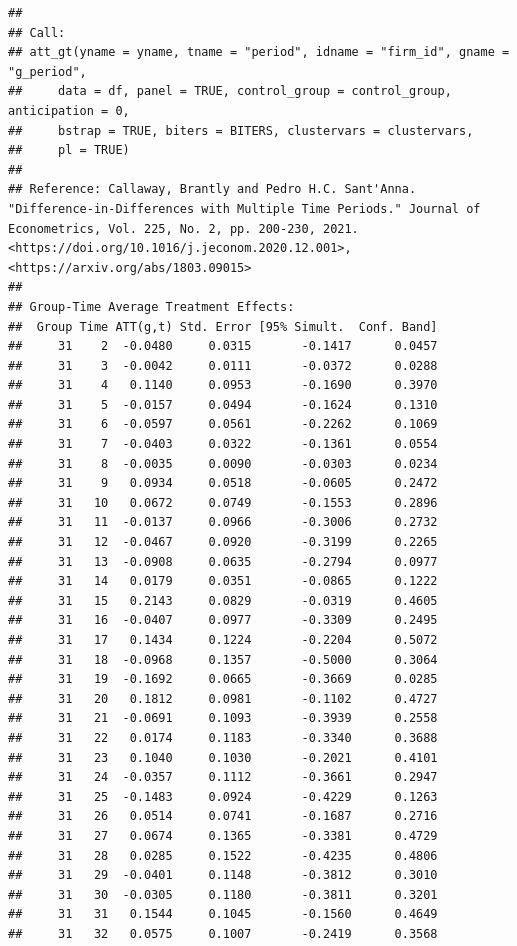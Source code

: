 \documentclass[
]{article}
\begin{document}
\begin{verbatim}
## 
## Call:
## att_gt(yname = yname, tname = "period", idname = "firm_id", gname = "g_period", 
##     data = df, panel = TRUE, control_group = control_group, anticipation = 0, 
##     bstrap = TRUE, biters = BITERS, clustervars = clustervars, 
##     pl = TRUE)
## 
## Reference: Callaway, Brantly and Pedro H.C. Sant'Anna.  "Difference-in-Differences with Multiple Time Periods." Journal of Econometrics, Vol. 225, No. 2, pp. 200-230, 2021. <https://doi.org/10.1016/j.jeconom.2020.12.001>, <https://arxiv.org/abs/1803.09015> 
## 
## Group-Time Average Treatment Effects:
##  Group Time ATT(g,t) Std. Error [95% Simult.  Conf. Band]  
##     31    2  -0.0480     0.0315       -0.1417      0.0457  
##     31    3  -0.0042     0.0111       -0.0372      0.0288  
##     31    4   0.1140     0.0953       -0.1690      0.3970  
##     31    5  -0.0157     0.0494       -0.1624      0.1310  
##     31    6  -0.0597     0.0561       -0.2262      0.1069  
##     31    7  -0.0403     0.0322       -0.1361      0.0554  
##     31    8  -0.0035     0.0090       -0.0303      0.0234  
##     31    9   0.0934     0.0518       -0.0605      0.2472  
##     31   10   0.0672     0.0749       -0.1553      0.2896  
##     31   11  -0.0137     0.0966       -0.3006      0.2732  
##     31   12  -0.0467     0.0920       -0.3199      0.2265  
##     31   13  -0.0908     0.0635       -0.2794      0.0977  
##     31   14   0.0179     0.0351       -0.0865      0.1222  
##     31   15   0.2143     0.0829       -0.0319      0.4605  
##     31   16  -0.0407     0.0977       -0.3309      0.2495  
##     31   17   0.1434     0.1224       -0.2204      0.5072  
##     31   18  -0.0968     0.1357       -0.5000      0.3064  
##     31   19  -0.1692     0.0665       -0.3669      0.0285  
##     31   20   0.1812     0.0981       -0.1102      0.4727  
##     31   21  -0.0691     0.1093       -0.3939      0.2558  
##     31   22   0.0174     0.1183       -0.3340      0.3688  
##     31   23   0.1040     0.1030       -0.2021      0.4101  
##     31   24  -0.0357     0.1112       -0.3661      0.2947  
##     31   25  -0.1483     0.0924       -0.4229      0.1263  
##     31   26   0.0514     0.0741       -0.1687      0.2716  
##     31   27   0.0674     0.1365       -0.3381      0.4729  
##     31   28   0.0285     0.1522       -0.4235      0.4806  
##     31   29  -0.0401     0.1148       -0.3812      0.3010  
##     31   30  -0.0305     0.1180       -0.3811      0.3201  
##     31   31   0.1544     0.1045       -0.1560      0.4649  
##     31   32   0.0575     0.1007       -0.2419      0.3568  

\end{verbatim}
\end{document}
